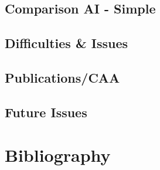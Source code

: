 \documentclass{report}
\begin{document}
      \section{Comparison AI - Simple}
      \section{Difficulties \& Issues}
      \section{Publications/CAA}
      \section{Future Issues}
\newpage 
\chapter{Bibliography}
\end{document}

